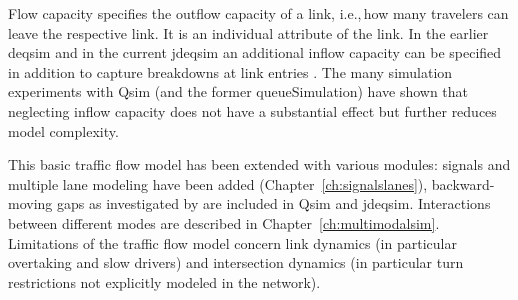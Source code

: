 Flow capacity specifies the outflow capacity of a link, i.e.,\,how many travelers can leave the respective link. It is an individual attribute of the link. In the earlier \gls{deqsim} and in the current \gls{jdeqsim} an additional inflow capacity can be specified in addition to capture breakdowns at link entries \citep[][p.99]{Charypar_PhDThesis_2008}. The many simulation experiments with Qsim (and the former queueSimulation) have shown that neglecting inflow capacity does not have a substantial effect but further reduces model complexity. 

This basic traffic flow model has been extended with various modules: signals and multiple lane modeling have been added (Chapter~\ref{ch:signalslanes}), backward-moving gaps as investigated by \citet[][]{Charypar_PhDThesis_2008} are included in Qsim and \gls{jdeqsim}. Interactions between different modes are described in Chapter~\ref{ch:multimodalsim}. Limitations of the traffic flow model concern link dynamics (in particular overtaking and slow drivers) and intersection dynamics (in particular turn restrictions not explicitly modeled in the network). 


